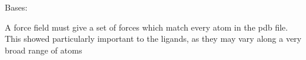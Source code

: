 \documentclass[letterpaper,10pt,english]{sphinxmanual}
\begin{document}

\begin{fulllineitems}
\label{\detokenize{protein:protein.Ligand}}
\pysigstartsignatures
{}
\pysigstopsignatures
\sphinxAtStartPar
Bases: {\hyperref[\detokenize{protein:protein.Compound}]{}}

\begin{fulllineitems}
\label{\detokenize{protein:protein.Ligand.check_forces}}
\pysigstartsignatures
{}
\pysigstopsignatures
\sphinxAtStartPar
A force field must give a set of forces which match every atom in
the pdb file. This showed particularly important to the ligands, as they
may vary along a very broad range of atoms

\end{fulllineitems}


\end{fulllineitems}

\end{document}
